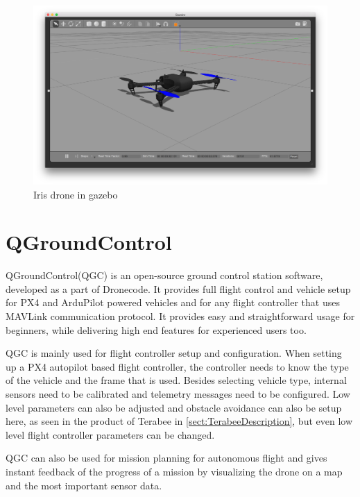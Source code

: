 \begin{figure}[h]
    \centering
    \includegraphics[width=140mm]{figures/iris_gazebo.png}
    \caption{Iris drone in gazebo}
    \label{fig:px4_sitl_iris}
\end{figure}

\section{QGroundControl}
QGroundControl(QGC) is an open-source ground control station software, developed as a part of Dronecode. It provides
full flight control and vehicle setup for PX4 and ArduPilot powered vehicles and for any flight controller that
uses MAVLink communication protocol. It provides easy and straightforward usage for beginners, while delivering
high end features for experienced users too.

QGC is mainly used for flight controller setup and configuration. When setting up a PX4 autopilot based flight 
controller, the controller needs to know the type of the vehicle and the frame that is used. Besides selecting 
vehicle type, internal sensors need to be calibrated and telemetry messages need to be configured. Low level 
parameters can also be adjusted and obstacle avoidance can also be setup here, as seen in the product of Terabee
in \ref{sect:TerabeeDescription}, but even low level flight controller parameters can be changed.

QGC can also be used for mission planning for autonomous flight and gives instant feedback of the progress of a 
mission by visualizing the drone on a map and the most important sensor data.

